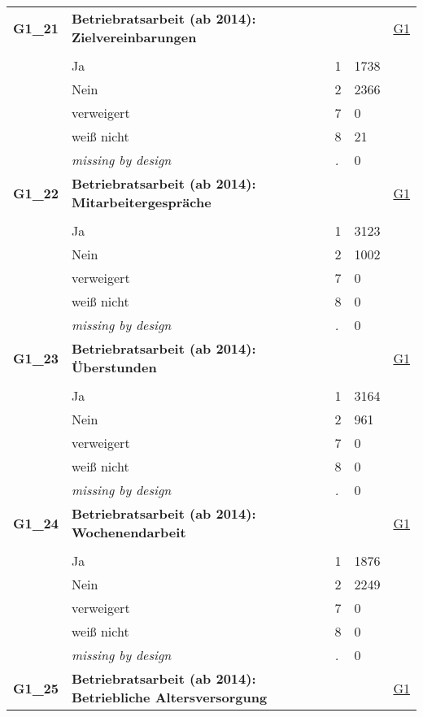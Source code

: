 \begin{longtable}{| L{2.65cm} | L{8cm} | C{1.5cm} | R{1.25cm} | C{2.25cm}  |}
   \midrule
\textbf{G1\_21}\label{var:G1:21} & \textbf{Betriebratsarbeit (ab 2014): Zielvereinbarungen} &  &  & \hyperref[G1]{G1} \\ 
   &  &  &  &  \\ 
   & Ja & 1 & 1738 &  \\ 
   & Nein & 2 & 2366 &  \\ 
   & verweigert & 7 & 0 &  \\ 
   & weiß nicht & 8 & 21 &  \\ 
   & \textit{missing by design} & \textit{.} & 0 &  \\ 
   \midrule
\textbf{G1\_22}\label{var:G1:22} & \textbf{Betriebratsarbeit (ab 2014): Mitarbeitergespräche} &  &  & \hyperref[G1]{G1} \\ 
   &  &  &  &  \\ 
   & Ja & 1 & 3123 &  \\ 
   & Nein & 2 & 1002 &  \\ 
   & verweigert & 7 & 0 &  \\ 
   & weiß nicht & 8 & 0 &  \\ 
   & \textit{missing by design} & \textit{.} & 0 &  \\ 
   \midrule
\textbf{G1\_23}\label{var:G1:23} & \textbf{Betriebratsarbeit (ab 2014): Überstunden} &  &  & \hyperref[G1]{G1} \\ 
   &  &  &  &  \\ 
   & Ja & 1 & 3164 &  \\ 
   & Nein & 2 & 961 &  \\ 
   & verweigert & 7 & 0 &  \\ 
   & weiß nicht & 8 & 0 &  \\ 
   & \textit{missing by design} & \textit{.} & 0 &  \\ 
   \midrule
\textbf{G1\_24}\label{var:G1:24} & \textbf{Betriebratsarbeit (ab 2014): Wochenendarbeit} &  &  & \hyperref[G1]{G1} \\ 
   &  &  &  &  \\ 
   & Ja & 1 & 1876 &  \\ 
   & Nein & 2 & 2249 &  \\ 
   & verweigert & 7 & 0 &  \\ 
   & weiß nicht & 8 & 0 &  \\ 
   & \textit{missing by design} & \textit{.} & 0 &  \\ 
   \midrule
\textbf{G1\_25}\label{var:G1:25} & \textbf{Betriebratsarbeit (ab 2014): Betriebliche Altersversorgung} &  &  & \hyperref[G1]{G1} \\ 

\end{longtable}
